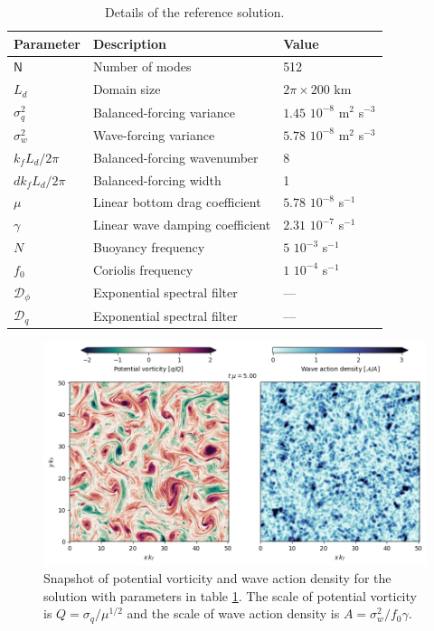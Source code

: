 \documentclass[12pt]{article}
\newcommand{\D}{\mathcal{D}}
\begin{document}
\begin{table}
 \begin{center}
   \caption{Details of the reference solution.}
   \label{parameters_reference}
   \begin{tabular}{ l | l | l }
     \hline
      Parameter & Description & Value \\
      \hline
      $\mathsf{N}$   & Number of modes &  512  \\
      $L_d$ & Domain size & $2\pi\times 200$ km \\
      $\sigma_q^2$ & Balanced-forcing variance & $1.45\,\,10^{-8}$ m$^2$ s$^{-3}$ \\
      $\sigma_w^2$ & Wave-forcing variance & $5.78\,\,10^{-8}$ m$^2$ s$^{-3}$ \\
      $k_f L_d/2\pi$    & Balanced-forcing wavenumber & 8 \\
      ${dk}_f L_d/2\pi$    & Balanced-forcing width &  1 \\
      $\mu$ & Linear bottom drag coefficient & $5.78\,\,10^{-8}$ s$^{-1}$ \\
      $\gamma$ & Linear wave damping coefficient & $2.31\,\,10^{-7}$ s$^{-1}$ \\
      $N$ & Buoyancy frequency &  $5\,\,10^{-3}$ s$^{-1}$\\
      $f_0$ & Coriolis frequency &  $1\,\,10^{-4}$ s$^{-1}$\\
      $\D_\phi$ & Exponential spectral filter & ---\\
      $\D_q$ & Exponential spectral filter & ---\\
   \end{tabular}
 \end{center}
\end{table}

\begin{figure}
\centering
\includegraphics[width=.925\textwidth]{figs/snapshots_pv_qg-niw_reference.png}
\caption{Snapshot of potential vorticity and wave action density for the solution
         with parameters in  table \ref{parameters_reference}. The scale of potential vorticity
         is $Q = \sigma_q/\mu^{1/2} $ and the scale of wave action density is
         $A = \sigma_w^2/f_0 \gamma$.}
        \label{snapshots_pv_qg-niw_reference}
\end{figure}
\end{document}
